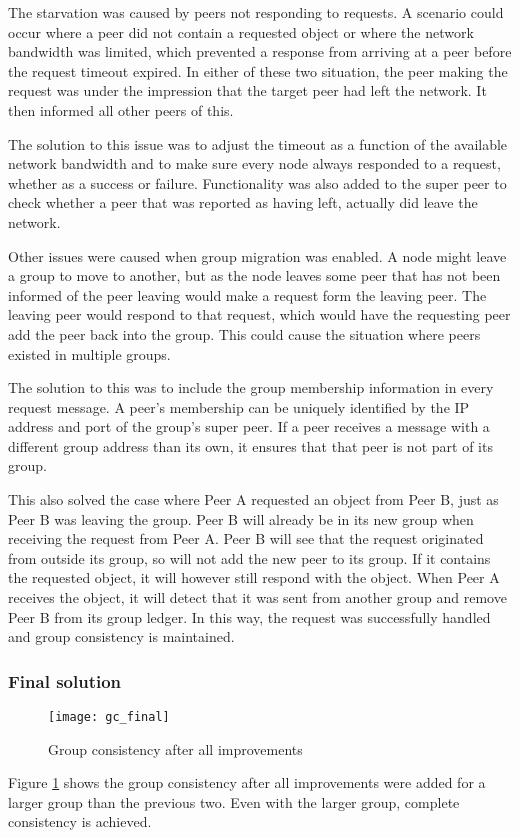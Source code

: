 The starvation was caused by peers not responding to requests. A scenario could occur where a peer did not contain a requested object or where the network bandwidth was limited, which prevented a response from arriving at a peer before the request timeout expired. In either of these two situation, the peer making the request was under the impression that the target peer had left the network. It then informed all other peers of this.

The solution to this issue was to adjust the timeout as a function of the available network bandwidth and to make sure every node always responded to a request, whether as a success or failure. Functionality was also added to the super peer to check whether a peer that was reported as having left, actually did leave the network.

Other issues were caused when group migration was enabled. A node might leave a group to move to another, but as the node leaves some peer that has not been informed of the peer leaving would make a request form the leaving peer. The leaving peer would respond to that request, which would have the requesting peer add the peer back into the group. This could cause the situation where peers existed in multiple groups.

The solution to this was to include the group membership information in every request message. A peer's membership can be uniquely identified by the IP address and port of the group's super peer. If a peer receives a message with a different group address than its own, it ensures that that peer is not part of its group.

This also solved the case where Peer A requested an object from Peer B, just as Peer B was leaving the group. Peer B will already be in its new group when receiving the request from Peer A. Peer B will see that the request originated from outside its group, so will not add the new peer to its group. If it contains the requested object, it will however still respond with the object. When Peer A receives the object, it will detect that it was sent from another group and remove Peer B from its group ledger. In this way, the request was successfully handled and group consistency is maintained.

\subsubsection{Final solution}
\begin{figure}[htbp]
 \centering
 \texttt{[image: gc\_final]}
 \caption{Group consistency after all improvements}
 \label{fig_gc_final}
\end{figure}
%
Figure \ref{fig_gc_final} shows the group consistency after all improvements were added for a larger group than the previous two. Even with the larger group, complete consistency is achieved.

